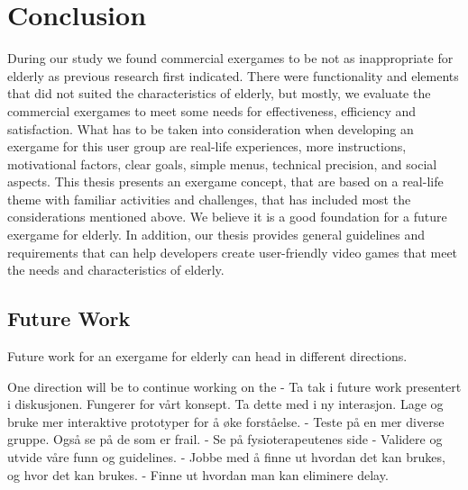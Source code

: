 \chapter{Conclusion}

During our study we found commercial exergames to be not as inappropriate for elderly as previous research first indicated. There were functionality and elements that did not suited the characteristics of elderly, but mostly, we evaluate the commercial exergames to meet some needs for effectiveness, efficiency and satisfaction.  What has to be taken into consideration when developing an exergame for this user group are real-life experiences, more instructions, motivational factors, clear goals, simple menus, technical precision, and social aspects. This thesis presents an exergame concept, that are based on a real-life theme with familiar activities and challenges, that has included most the considerations mentioned above. We believe it is a good foundation for a future exergame for elderly. In addition, our thesis provides general guidelines and requirements that can help developers create user-friendly video games that meet the needs and characteristics of elderly.  

\section{Future Work}

Future work for an exergame for elderly can head in different directions. 

One direction will be to continue working on the 
- Ta tak i future work presentert i diskusjonen. Fungerer for vårt konsept. Ta dette med i ny interasjon. Lage og bruke mer interaktive prototyper for å øke forståelse. 
- Teste på en mer diverse gruppe. Også se på de som er frail. 
- Se på fysioterapeutenes side
- Validere og  utvide våre funn og guidelines.  
- Jobbe med å finne ut hvordan det kan brukes, og hvor det kan brukes.
- Finne ut hvordan man kan eliminere delay.
